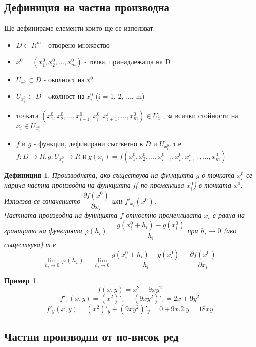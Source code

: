 \documentclass[fleqn]{article}
\newtheorem{example}{Пример}[subsection]
\newtheorem{definition}{Дефиниция}[subsection]
\begin{document}
\subsection{Дефиниция на частна производна}
Ще дефинираме елементи които ще се използват. 
\begin{itemize}
	\item $D \subset R^m$ -  отворено множество
	\item $x^0 = (x_1 ^ 0, x_2 ^ 0, ... , x_m ^ 0)$ - точка, принадлежаща на D
	\item $U_{x^0} \subset D$ - околност на $x^0$
	\item $U_{x_i ^ 0} \subset D$ - oколност на $x_i ^ 0$ (i  = 1, 2, ..., m)
	\item точката $(x_1 ^ 0, x_2 ^ 0, ..., x_{i-1}^0, x_i ^ 0, x_{i+1} ^i, ..., x_m ^ 0) \in U_{x^0}$, за всички стойности на $x_i \in U_{x_i ^ 0}$
	\item $f$ и $g$ - функции, дефинирани съответно в $D$ и $U_{x_i ^ 0}$. т.е \\
$f: D \rightarrow R , g: U_{x_i ^ 0} \rightarrow R$ и $g(x_i) = f(x_1 ^ 0, x_2 ^ 0, ..., x_{i-1}^0, x_i ^ 0, x_{i+1} ^i, ..., x_m ^ 0)$
\end{itemize}
 
\begin{definition}
Производната, ако съществува на функцията $g$ в точката $x_i ^ 0$ се нарича частна производна на функцията f( по променлива  $x_i ^ 0$) в точката $x^0$. Използва се означението $\dfrac {\partial f(x^0)}{\partial x_i}$ или $f'_{x_i} (x^0)$. \\
Частната производна на функцията $f$ отностно променливата $x_i$ е равна на границата на функцията $\varphi (h_i)  = \dfrac{g(x_i ^0 + h_i) - g(x_i ^ 0)}{h_i}$ при $h_i \rightarrow 0$ (ако съществува) т.е
$$\lim_{h_i \rightarrow 0} \varphi (h_i) = \lim_{h_i \rightarrow 0} \dfrac{g(x_i ^0 + h_i) - g(x_i ^ 0)}{h_i} = \dfrac {\partial f(x^0)}{\partial x_i}$$
\end{definition}

\begin{example}
$$f(x,y) = x^2 + 9xy^2$$
$$f'_x (x,y) = (x^2)'_x+(9xy^2)'_x = 2x + 9y^2$$
$$f'_y (x,y) = (x^2)'_y+(9xy^2)'_y = 0 + 9x.2.y = 18xy $$
\end{example}

\subsection{Частни производни от по-висок ред}
\end{document}
